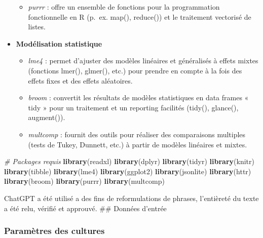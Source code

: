 \documentclass[
]{article}
\newenvironment{Shaded}{\begin{snugshade}}{\end{snugshade}}
\newcommand{\CommentTok}[1]{\textcolor[rgb]{0.56,0.35,0.01}{\textit{#1}}}
\newcommand{\FunctionTok}[1]{\textcolor[rgb]{0.13,0.29,0.53}{\textbf{#1}}}
\newcommand{\NormalTok}[1]{#1}
\providecommand{\tightlist}{%
  \setlength{\itemsep}{0pt}\setlength{\parskip}{0pt}}
\begin{document}
\begin{itemize}
  \begin{itemize}
  \tightlist
  \item
    \emph{purrr} : offre un ensemble de fonctions pour la programmation
    fonctionnelle en R (p.~ex. map(), reduce()) et le traitement
    vectorisé de listes.
  \end{itemize}
\item
  \textbf{Modélisation statistique}

  \begin{itemize}
  \item
    \emph{lme4} : permet d'ajuster des modèles linéaires et généralisés
    à effets mixtes (fonctions lmer(), glmer(), etc.) pour prendre en
    compte à la fois des effets fixes et des effets aléatoires.
  \item
    \emph{broom} : convertit les résultats de modèles statistiques en
    data frames « tidy » pour un traitement et un reporting facilités
    (tidy(), glance(), augment()).
  \item
    \emph{multcomp} : fournit des outils pour réaliser des comparaisons
    multiples (tests de Tukey, Dunnett, etc.) à partir de modèles
    linéaires et mixtes.
  \end{itemize}
\end{itemize}

\begin{Shaded}
\begin{Highlighting}[]
\CommentTok{\# Packages requis}
\FunctionTok{library}\NormalTok{(readxl)}
\FunctionTok{library}\NormalTok{(dplyr)}
\FunctionTok{library}\NormalTok{(tidyr)}
\FunctionTok{library}\NormalTok{(knitr)}
\FunctionTok{library}\NormalTok{(tibble)}
\FunctionTok{library}\NormalTok{(lme4)}
\FunctionTok{library}\NormalTok{(ggplot2)}
\FunctionTok{library}\NormalTok{(jsonlite)}
\FunctionTok{library}\NormalTok{(httr)}
\FunctionTok{library}\NormalTok{(broom)}
\FunctionTok{library}\NormalTok{(purrr)}
\FunctionTok{library}\NormalTok{(multcomp)}
\end{Highlighting}
\end{Shaded}

ChatGPT a été utilisé a des fins de reformulations de phrases,
l'entièreté du texte a été relu, vérifié et approuvé. \#\# Données
d'entrée

\subsubsection{Paramètres des
cultures}\label{paramuxe8tres-des-cultures}
\end{document}
